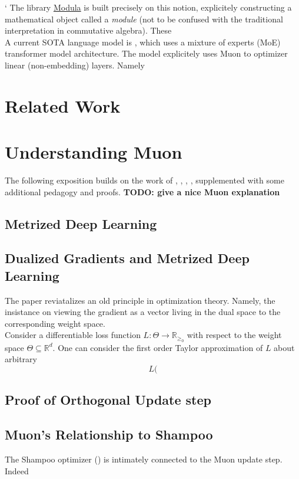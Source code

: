 \documentclass[12pt]{book}
\newcommand{\R}{\mathbb{R}}
\newcommand{\todo}[1]{{\color{red}\bf{TODO: #1}}}
\begin{document}
 `
The library \href{https://github.com/modula-systems/modula}{Modula} is built precisely on this notion, explicitely constructing a mathematical object called a \textit{module} (not to be confused with the traditional interpretation in commutative algebra). These 
\\
A current SOTA language model is \cite{moonshot}, which uses a  mixture of experts (MoE) transformer model architecture. The model explicitely uses Muon to optimizer linear (non-embedding) layers. Namely
\\
\section{Related Work}
\section{Understanding Muon}
The following exposition builds on the work of \cite{bernstein2024modulardualitydeeplearning}, \cite{bernstein2024oldoptimizernewnorm}, \cite{bernstein2025deriving}, \cite{jordan2024muon}, \cite{pethick2025trainingdeeplearningmodels} supplemented with some additional pedagogy and proofs.
\todo{give a nice Muon explanation}
\\

\subsection{Metrized Deep Learning}

\subsection{Dualized Gradients and Metrized Deep Learning}
The paper \cite{bernstein2024modulardualitydeeplearning} reviatalizes an old principle in optimization theory. Namely, the insistance on viewing the gradient as a vector living in the dual space to the corresponding weight space.  \\
Consider a differentiable loss function $L:\Theta \to \R_{\ge_0}$ with respect to the weight space $\Theta \subseteq \R^{d}$. One can consider the first order Taylor approximation of $L$ about arbitrary
\[
 L(
\]
\subsection{Proof of Orthogonal Update step}
\subsection{Muon's Relationship to Shampoo}
The Shampoo optimizer (\cite{gupta2018shampoopreconditionedstochastictensor}) is intimately connected to the Muon update step. 
\\ 
Indeed 
\end{document}
